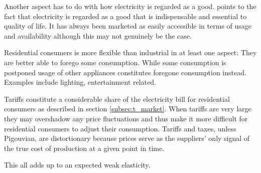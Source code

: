  Another aspect has to do with how electricity is regarded as a good. \citet{kirschen2003demand} points to the fact that electricity is regarded as a good that is indispensable and essential to quality of life. It has always been marketed as easily accessible in terms of usage and availability although this may not genuinely be the case.
 \medskip

 Residential consumers is more flexible than industrial in at least one aspect: They are better able to forego some consumption. While some consumption is postponed usage of other appliances constitutes foregone consumption instead. Examples include lighting, entertainment related.

Tariffs constitute a considerable share of the electricity bill for residential consumers as described in section \ref{subsec:t_market}. When tariffs are very large they may overshadow any price fluctuations and thus make it more difficult for residential consumers to adjust their consumption. Tariffs and taxes, unless Pigouvian, are distortionary because prices serve as the suppliers' only signal of the true cost of production at a given point in time.

This all adds up to an expected weak elasticity.

